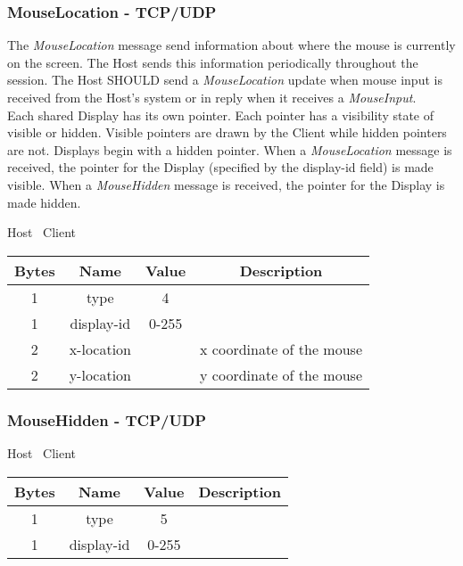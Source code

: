 \subsubsection{MouseLocation - TCP/UDP}

The \emph{MouseLocation} message send information about where the mouse is currently on the screen.
The Host sends this information periodically throughout the session.
The Host SHOULD send a \emph{MouseLocation} update when mouse input is received from the Host's system or in
reply when it receives a \emph{MouseInput}.\\

Each shared Display has its own pointer.
Each pointer has a visibility state of visible or hidden.
Visible pointers are drawn by the Client while hidden pointers are not.
Displays begin with a hidden pointer.
When a \emph{MouseLocation} message is received, the pointer for the Display (specified by the display-id field) is made visible.
When a \emph{MouseHidden} message is received, the pointer for the Display is made hidden.

\begin{center}
    Host \textrightarrow\ Client\\
    \begin{tabular}{|c|c|c|c|}
        \hline
        \textbf{Bytes} & \textbf{Name} & \textbf{Value} & \textbf{Description}      \\
        \hline
        1              & type          & 4              &                           \\
        \hline
        1              & display-id    & 0-255          &                           \\
        \hline
        2              & x-location    &                & x coordinate of the mouse \\
        \hline
        2              & y-location    &                & y coordinate of the mouse \\
        \hline
    \end{tabular}
\end{center}

\subsubsection{MouseHidden - TCP/UDP}

\begin{center}
    Host \textrightarrow\ Client\\
    \begin{tabular}{|c|c|c|c|}
        \hline
        \textbf{Bytes} & \textbf{Name} & \textbf{Value} & \textbf{Description}      \\
        \hline
        1              & type          & 5              &                           \\
        \hline
        1              & display-id    & 0-255          &                           \\
        \hline
    \end{tabular}
\end{center}

